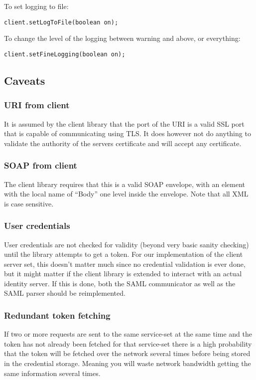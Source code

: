     To set logging to file:
    
\begin{lstlisting}[caption={Turn logging to file on or off}, label=userguideTogglelogtofile]
    client.setLogToFile(boolean on);
\end{lstlisting}

    To change the level of the logging between warning and above, or everything:

\begin{lstlisting}[caption={Switch between the two logging scopes}, label=userguideToggleloggingdetails]
    client.setFineLogging(boolean on);
\end{lstlisting}

\subsection{Caveats}\label{userguideCaveats}
\subsubsection{URI from client}
It is assumed by the client library that the port of the URI is a valid SSL port that is capable of communicating using TLS. It does however not do anything to validate the authority of the servers certificate and will accept any certificate.

\subsubsection{SOAP from client}
The client library requires that this is a valid SOAP envelope, with an element with the local name of “Body” one level inside the envelope. Note that all XML is case sensitive.

\subsubsection{User credentials}
User credentials are not checked for validity (beyond very basic sanity checking) until the library attempts to get a token.
For our implementation of the client server set, this doesn’t matter much since no credential validation is ever done, but it might matter if the client library is extended to interact with an actual identity server. If this is done, both the SAML communicator as well as the SAML parser should be reimplemented.

\subsubsection{Redundant token fetching}
If two or more requests are sent to the same service-set at the same time and the token has not already been fetched for that service-set there is a high probability that the token will be fetched over the network several times before being stored in the credential storage. Meaning you will waste network bandwidth getting the same information several times.

